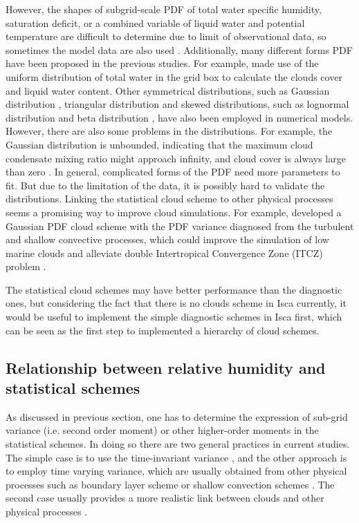 However, the shapes of subgrid-scale PDF of total water specific
humidity, saturation deficit, or a combined variable of liquid water and potential temperature are difficult to determine due to limit of observational data, so sometimes the model data are also used \citep{Bony2001}. Additionally, many different forms PDF have been proposed in the previous studies. For example, \cite{LeTreut1991} made use of the uniform distribution of total water in the grid box to calculate the clouds cover and liquid water content. Other symmetrical distributions, such as Gaussian distribution \citep{Sommeria1977}, triangular distribution \citep{Smith1990} and skewed distributions, such as lognormal distribution \citep{Bony2001} and beta distribution \citep{Tompkins2002}, have also been employed in numerical models. However, there are also some problems in the distributions. For example, the Gaussian distribution is unbounded, indicating that the maximum cloud condensate mixing ratio might approach infinity, and cloud cover is always large than zero \citep{Tompkins2002}. In general, complicated forms of the PDF need more parameters to fit. But due to the limitation of the data, it is possibly hard to validate the distributions. Linking the statistical cloud scheme to other physical processes seems a promising way to improve cloud simulations. For example, \cite{Qin2018} developed a Gaussian PDF cloud scheme with the PDF variance diagnosed from the turbulent
and shallow convective processes, which could improve the simulation of low marine clouds and alleviate double Intertropical Convergence Zone (ITCZ) problem \citep{Qin2018alleviated}.

The statistical cloud schemes may have better performance than the diagnostic ones, but considering the fact that there is no clouds scheme in Isca currently, it would be useful to implement the simple diagnostic schemes in Isca first, which can be seen as the first step to implemented a hierarchy of cloud schemes.

\subsection{Relationship between relative humidity and statistical schemes}

As discussed in previous section, one has to determine the expression of sub-grid variance (i.e. second order moment) or other higher-order moments in the statistical schemes. In doing so there are two general practices in current studies. The simple case is to use the time-invariant variance \citep[e.g.,][]{Sundqvist1978,Smith1990}, and the other approach is to employ time varying variance, which are usually obtained from other physical processes such as boundary layer scheme or shallow convection schemes \citep[e.g.,][]{Qin2018}. The second case usually provides a more realistic link between clouds and other physical processes \citep{Tompkins2002}. 

